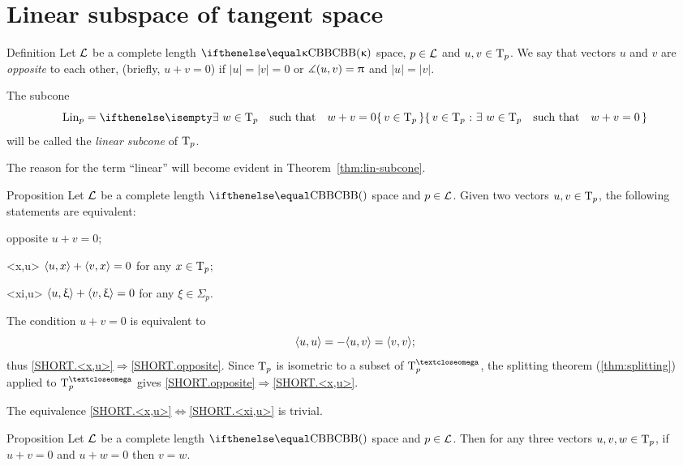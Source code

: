 \section{Linear subspace of tangent space}

\begin{thm}{Definition}\label{def:opp+Lin}
Let $\mathcal{L}$ be a complete length $\Alex{\kappa}$ space, $p\in \spc{L}$ and $u,v\in\T_p$.
We say that vectors $u$ and $v$ are \emph{opposite}\label{def:opposite:page} to each other, (briefly, $u+v=0$) if $|u|=|v|=0$ or $\measuredangle(u,v)=\uppi$ and $|u|=|v|$.

The subcone
\[\Lin_p=\set{v\in\T_p}{\exists\ w\in\T_p\quad \text{such that}\quad w+v=0}\]
will be called the \emph{linear subcone} of $\text{\rm T}_p$.
\end{thm}

The reason for the term ``linear'' will become evident in Theorem~\ref{thm:lin-subcone}.

\begin{thm}{Proposition}\label{prop:opposite}
Let $\mathcal{L}$ be a complete length $\Alex{}$ space and $p\in \spc{L}$.
Given two vectors $u,v\in\T_p$, the following statements are equivalent:
\begin{subthm}{opposite} $u+v=0$;
\end{subthm}
\begin{subthm}{<x,u>} $\langle u,x\rangle+\langle v,x\rangle=0$ for any $x\in\T_p$;
\end{subthm}
\begin{subthm}{<xi,u>} $\langle u,\upxi\rangle+\langle v,\upxi\rangle=0$ for any $\xi\in\Sigma_p$.
\end{subthm}
\end{thm}

The condition $u+v=0$ is equivalent to 
\[\langle u,u\rangle=-\langle u,v\rangle=\langle v,v\rangle;\]
thus 
\ref{SHORT.<x,u>}$\Rightarrow$\ref{SHORT.opposite}.
Since $\text{\rm T}_p$ is isometric to a subset of $\T^\o_p$,
the splitting theorem (\ref{thm:splitting}) applied to $\T_p^\o$
gives \ref{SHORT.opposite}$\Rightarrow$\ref{SHORT.<x,u>}.

The equivalence  \ref{SHORT.<x,u>}$\Leftrightarrow$\ref{SHORT.<xi,u>} is trivial.
\qeds

\begin{thm}{Proposition}\label{prop:two-opp}
Let $\mathcal{L}$  be a complete length $\Alex{}$ space and $p\in \spc{L}$.
Then for any three vectors $u,v,w\in\T_p$, if $u+v=0$ and $u+ w=0$ then $v=w$.
\end{thm}

